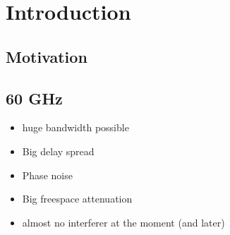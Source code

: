 \chapter{Introduction}
\label{ch:introduction}

\section{Motivation}
\label{sec:motivation}

\section{60 GHz}
\begin{itemize}
\item huge bandwidth possible
\item Big delay spread
\item Phase noise
\item Big freespace attenuation
\item almost no interferer at the moment (and later)
\end{itemize}

\label{sec:60g}

